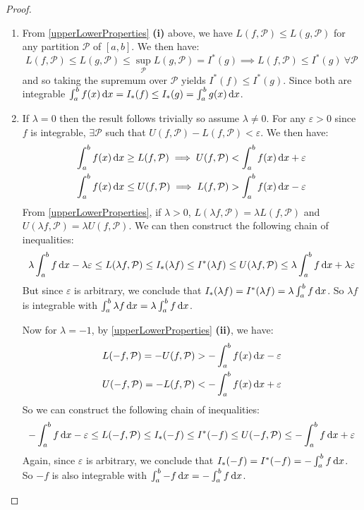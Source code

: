 \documentclass[../main.tex]{subfiles}
\begin{document}
\begin{proof}
  \begin{enumerate}
    \item From \cref{upperLowerProperties} \textbf{(i)} above, we have $L(f, \mathcal{P}) \leq L(g, \mathcal{P})$ for any partition $\mathcal{P}$ of $[a, b]$.
      We then have:
      \[
        L(f, \mathcal{P}) \leq L(g, \mathcal{P}) \leq \sup_{\mathcal{P}} L(g, \mathcal{P}) = I^{*}(g) \implies L(f, \mathcal{P}) \leq I^{*}(g)\ \forall \mathcal{P}
      \]
      and so taking the supremum over $\mathcal{P}$ yields $I^{*}(f) \leq I^{*}(g)$.
      Since both are integrable $\int_{a}^{b} f(x) \d{x} = I_{*}(f) \leq I_{*}(g) = \int_{a}^{b} g(x) \d{x}$.
    \item If $\lambda = 0$ then the result follows trivially so assume $\lambda \neq 0$.
      For any $\varepsilon > 0$ since $f$ is integrable, $\exists \mathcal{P}$ such that $U(f, \mathcal{P}) - L(f, \mathcal{P}) < \varepsilon$.
      We then have:
      \begin{align*}
        \int_{a}^{b} f(x) \d{x} \geq L(f, \mathcal{P}) \implies U(f, \mathcal{P}) < \int_{a}^{b} f(x) \d{x} + \varepsilon \\
        \int_{a}^{b} f(x) \d{x} \leq U(f, \mathcal{P}) \implies L(f, \mathcal{P}) > \int_{a}^{b} f(x) \d{x} - \varepsilon
      \end{align*}
      From \cref{upperLowerProperties}, if $\lambda > 0$, $L(\lambda f, \mathcal{P}) = \lambda L(f, \mathcal{P})$ and $U(\lambda f, \mathcal{P}) = \lambda U(f, \mathcal{P})$.
      We can then construct the following chain of inequalities:
      \[
        \lambda \int_{a}^{b} f \d{x} -\lambda \varepsilon \leq L(\lambda f, \mathcal{P}) \leq I_{*}(\lambda f) \leq I^{*}(\lambda f) \leq U(\lambda f, \mathcal{P}) \leq \lambda \int_{a}^{b} f \d{x} + \lambda \varepsilon
      \]
      But since $\varepsilon$ is arbitrary, we conclude that $I_{*}(\lambda f) = I^{*}(\lambda f) = \lambda \int_{a}^{b} f \d{x}$.
      So $\lambda f$ is integrable with $\int_{a}^{b} \lambda f \d{x} = \lambda \int_{a}^{b} f \d{x}$.

      Now for $\lambda = -1$, by \cref{upperLowerProperties} \textbf{(ii)}, we have:
      \begin{align*}
        L(-f, \mathcal{P}) = - U(f, \mathcal{P}) > -\int_{a}^{b} f(x) \d{x} - \varepsilon \\
        U(-f, \mathcal{P}) = - L(f, \mathcal{P}) < -\int_{a}^{b} f(x) \d{x} + \varepsilon
      \end{align*}
      So we can construct the following chain of inequalities:
      \[
        - \int_{a}^{b} f \d{x} - \varepsilon \leq L(-f, \mathcal{P}) \leq I_{*}(-f) \leq I^{*}(-f) \leq U(-f, \mathcal{P}) \leq - \int_{a}^{b} f \d{x} + \varepsilon
      \]
      Again, since $\varepsilon$ is arbitrary, we conclude that $I_{*}(-f) = I^{*}(-f) = - \int_{a}^{b} f \d{x}$.
      So $-f$ is also integrable with $\int_{a}^{b} -f \d{x} = -\int_{a}^{b} f \d{x}$.


\end{enumerate}
\end{proof}
\end{document}
